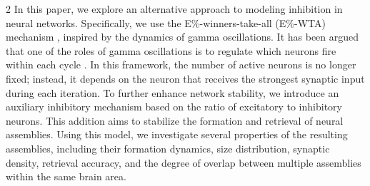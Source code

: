 \documentclass[a4paper, 10pt]{article}
\begin{document}
\begin{multicols}{2}
In this paper, we explore an alternative approach to modeling inhibition in neural networks. Specifically, we use the E\%-winners-take-all (E\%-WTA) mechanism \cite{licurgo}, inspired by the dynamics of gamma oscillations. It has been argued that one of the roles of gamma oscillations is to regulate which neurons fire within each cycle \cite{Fries2007-cx}. In this framework, the number of active neurons is no longer fixed; instead, it depends on the neuron that receives the strongest synaptic input during each iteration. To further enhance network stability, we introduce an auxiliary inhibitory mechanism based on the ratio of excitatory to inhibitory neurons. This addition aims to stabilize the formation and retrieval of neural assemblies. Using this model, we investigate several properties of the resulting assemblies, including their formation dynamics, size distribution, synaptic density, retrieval accuracy, and the degree of overlap between multiple assemblies within the same brain area.








\end{multicols}
\end{document}
